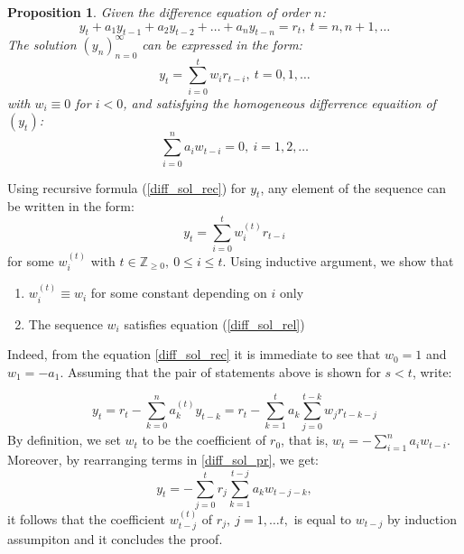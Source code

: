 \documentclass[12pt]{article}
\newtheorem{proposition}[theorem]{Proposition}
\theoremstyle{definition}
\theoremstyle{remark}
\numberwithin{equation}{section}
\newcommand{\ZZ}{\mathbb{Z}}
\begin{document}
\begin{proposition}\label{diff_sol}
	Given the difference equation of order $n$:
	\begin{equation}\label{diff_sol_rec}
		y_t + a_1y_{t-1} + a_2y_{t-2} + \ldots + a_ny_{t-n} = r_t, \ t = n, n+1, \ldots
	\end{equation}
	The solution $\left(y_n\right)_{n = 0}^{\infty}$ can be expressed in the form:
	\begin{equation*}
		y_t =  \sum_{i = 0}^t w_ir_{t-i}, \ t = 0, 1, \ldots
	\end{equation*}
	with $w_i\equiv0$ for $i<0$, and satisfying the homogeneous differrence equaition of $(y_t)$:
	\begin{equation}\label{diff_sol_rel}
		\sum_{i = 0}^n a_iw_{t-i} = 0,\ i = 1, 2,\ldots
	\end{equation}

\end{proposition}
\proof
Using recursive formula (\ref{diff_sol_rec}) for $y_t$, any element of the sequence can be written in the form:
\begin{equation*}
	y_t = \sum_{i = 0}^t w_i^{(t)} r_{t-i}
\end{equation*}
for some $w_i^{(t)}$ with $t\in\ZZ_{\geq 0},\ 0\leq i\leq t$.
Using inductive argument, we show that
\begin{enumerate}
	\item $w_i^{(t)}\equiv w_i$ for some constant depending on $i$ only
	\item The sequence $w_i$ satisfies equation (\ref{diff_sol_rel})
\end{enumerate}

Indeed, from the equation \ref{diff_sol_rec} it is immediate to see that $w_0 = 1$ and $w_1 = -a_1$. Assuming that the pair of statements above is shown for $s < t$, write:

\begin{equation}\label{diff_sol_pr}
	y_t = r_t - \sum_{k = 0}^{n}a_k^{(t)}y_{t-k}=r_t - \sum_{k = 1}^{t}a_k\sum_{j = 0}^{t - k} w_jr_{t - k - j}
\end{equation}
By definition, we set $w_t$ to be the coefficient of $r_0$, that is,  $w_t = - \sum_{i = 1}^n a_iw_{t-i}$. Moreover, by rearranging terms in \ref{diff_sol_pr}, we get:
\begin{equation*}
	y_t = -\sum_{j = 0}^t r_j \sum_{k = 1}^{t-j}{a_k w_{t-j-k}},
\end{equation*}
it follows that the coefficient $w_{t-j}^{(t)}$ of $r_j, \ j = 1, \ldots t,$ is equal to $w_{t-j}$ by induction assumpiton and it concludes the proof.
\end{document}
